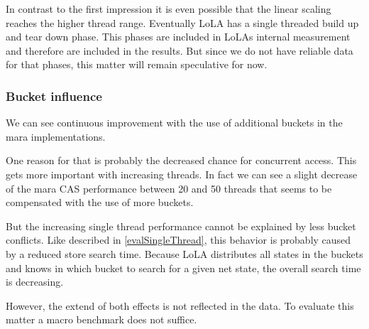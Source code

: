 In contrast to the first impression it is even possible that the linear scaling reaches the higher thread range. Eventually LoLA has a single threaded build up and tear down phase. This phases are included in LoLAs internal measurement and therefore are included in the results. But since we do not have reliable data for that phases, this matter will remain speculative for now.

\subsubsection{Bucket influence}
We can see continuous improvement with the use of additional buckets in the mara implementations. 

One reason for that is probably the decreased chance for concurrent access. This gets more important with increasing threads. In fact we can see a slight decrease of the mara CAS performance between 20 and 50 threads that seems to be compensated with the use of more buckets.

But the increasing single thread performance cannot be explained by less bucket conflicts. Like described in \ref{evalSingleThread}, this behavior is probably caused by a reduced store search time. Because LoLA distributes all states in the buckets and knows in which bucket to search for a given net state, the overall search time is decreasing.

However, the extend of both effects is not reflected in the data. To evaluate this matter a macro benchmark does not suffice.
